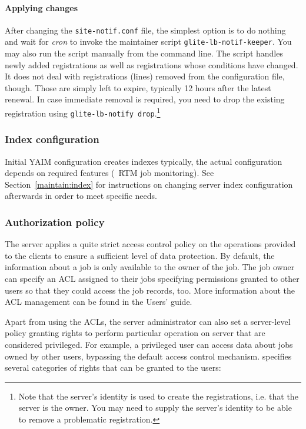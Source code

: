 \paragraph{Applying changes} After changing the \texttt{site-notif.conf} file, the simplest option is to do nothing and wait for \emph{cron} to invoke the maintainer script \texttt{glite-lb-notif-keeper}. You may also run the script manually from the command line. The script handles newly added registrations as well as registrations whose conditions have changed. It does not deal with registrations (lines) removed from the configuration file, though. Those are simply left to expire, typically 12 hours after the latest renewal. In case immediate removal is required, you need to drop the existing registration using \texttt{glite-lb-notify drop}.\footnote{Note that the server's identity is used to create the registrations, i.e. that the server is the owner. You may need to supply the server's identity to be able to remove a problematic registration.}

\subsubsection{Index configuration}

Initial YAIM configuration creates \LB indexes typically,
the actual configuration depends on required features (\eg\ RTM job monitoring).
See Section~\ref{maintain:index} for instructions
on changing \LB server index configuration afterwards in order
to meet specific needs.

\subsubsection{Authorization policy}
\label{inst:authz}
The \LB server applies a quite strict access control policy on the
operations provided to the clients to ensure a sufficient level of data
protection. By default, the information about a job is only available to the
owner of the job. The job owner can specify an ACL assigned to their jobs
specifying permissions granted to other users so that they could access the
job records, too. More information about the ACL management can be found in
the \LB Users' guide.

Apart from using the ACLs, the \LB server administrator can also set a
server-level policy granting rights to perform particular operation on \LB
server that are considered privileged.
For example, a privileged
user can access data about jobs owned by other users, bypassing the default
\LB access control mechanism.  specifies several categories of
rights that can be granted to the users:

